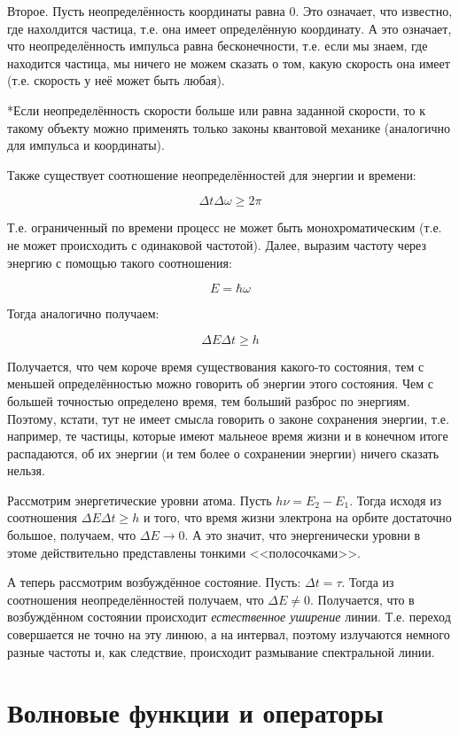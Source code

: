 \documentclass[a4paper,14pt]{article}
\newcommand{\mysection}[1]{\section*{#1}
\addcontentsline{toc}{section}{#1}}
\begin{document}
Второе. Пусть неопределённость координаты равна 0. Это означает, что известно, где нахолдится частица, т.е. она имеет определённую координату. А это означает, что неопределённость импульса равна бесконечности, т.е. если мы знаем, где находится частица, мы ничего не можем сказать о том, какую скорость она имеет (т.е. скорость у неё может быть любая).

*Если неопределённость скорости больше или равна заданной скорости, то к такому объекту можно применять только законы квантовой механике (аналогично для импульса и координаты).

Также существует соотношение неопределённостей для энергии и времени:

\[\Delta t\Delta \omega \geqslant 2\pi\]

Т.е. ограниченный по времени процесс не может быть монохроматическим (т.е. не может происходить с одинаковой частотой).
Далее, выразим частоту через энергию с помощью такого соотношения:

\[E=\hbar \omega\]

Тогда аналогично получаем:

\[\Delta E\Delta t \geqslant h\]

Получается, что чем короче время существования какого-то состояния, тем с меньшей определённостью можно говорить об энергии этого состояния. Чем с большей точностью определено время, тем больший разброс по энергиям. Поэтому, кстати, тут не имеет смысла говорить о законе сохранения энергии, т.е. например, те частицы, которые имеют мальнеое время жизни и в конечном итоге распадаются, об их энергии (и тем более о сохранении энергии) ничего сказать нельзя.

Рассмотрим энергетические уровни атома. Пусть $h\nu = E_2 - E_1$. Тогда исходя из соотношения $\Delta E\Delta t \geqslant h$ и того, что время жизни электрона на орбите достаточно большое, получаем, что $\Delta E \rightarrow 0$. А это значит, что энергенически уровни в этоме действительно представлены тонкими <<полосочками>>.

А теперь рассмотрим возбуждённое состояние. Пусть: $\Delta t =\tau$. Тогда из соотношения неопределённостей получаем, что $\Delta E \neq 0$. Получается, что в возбуждённом состоянии происходит \textit{естественное уширение} линии. Т.е. переход совершается не точно на эту линюю, а на интервал, поэтому излучаются немного разные частоты и, как следствие, происходит размывание спектральной линии. 

\mysection{Волновые функции и операторы}
\end{document}
